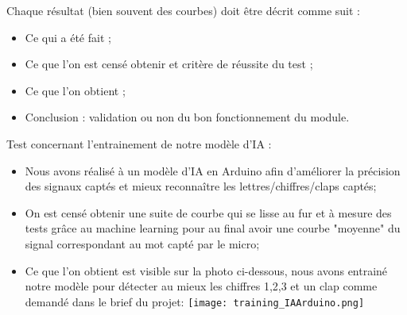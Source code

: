 \documentclass[a4paper,11pt]{book}
\begin{document}
\vspace{2mm}
\noindent Chaque résultat (bien souvent des courbes) doit être décrit comme suit : 
\begin{itemize}
	\item Ce qui a été fait ;
	\item Ce que l’on est censé obtenir et critère de réussite du test ;
	\item Ce que l’on obtient ;
	\item Conclusion : validation ou non du bon fonctionnement du module.
\end{itemize}

\noindent Test concernant l'entrainement de notre modèle d'IA : 
\begin{itemize}
	\item Nous avons réalisé à un modèle d'IA en Arduino afin d'améliorer la précision des signaux captés et mieux reconnaître les lettres/chiffres/claps captés;
	\item On est censé obtenir une suite de courbe qui se lisse au fur et à mesure des tests grâce au machine learning pour au final avoir une courbe "moyenne" du signal correspondant au mot capté par le micro;
	\item Ce que l’on obtient est visible sur la photo ci-dessous, nous avons entrainé notre modèle pour détecter au mieux les chiffres 1,2,3 et un clap comme demandé dans le brief du projet:
	\texttt{[image: training\_IAArduino.png]}

\end{itemize}
\end{document}
